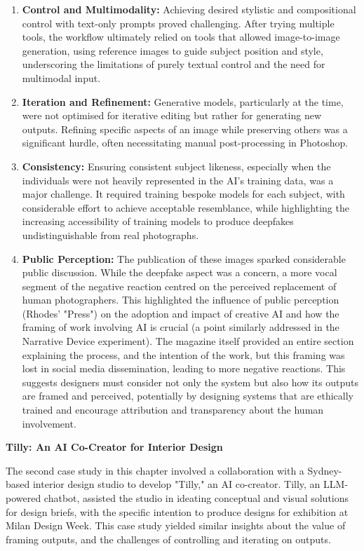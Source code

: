 \begin{enumerate}
    \item \textbf{Control and Multimodality:} Achieving desired stylistic and compositional control with text-only prompts proved challenging. After trying multiple tools, the workflow ultimately relied on tools that allowed image-to-image generation, using reference images to guide subject position and style, underscoring the limitations of purely textual control and the need for multimodal input.
    \item \textbf{Iteration and Refinement:} Generative models, particularly at the time, were not optimised for iterative editing but rather for generating new outputs. Refining specific aspects of an image while preserving others was a significant hurdle, often necessitating manual post-processing in Photoshop.
    \item \textbf{Consistency:} Ensuring consistent subject likeness, especially when the individuals were not heavily represented in the AI's training data, was a major challenge. It required training bespoke models for each subject, with considerable effort to achieve acceptable resemblance, while highlighting the increasing accessibility of training models to produce deepfakes undistinguishable from real photographs. 
    \item \textbf{Public Perception:} The publication of these images sparked considerable public discussion. While the deepfake aspect was a concern, a more vocal segment of the negative reaction centred on the perceived replacement of human photographers. This highlighted the influence of public perception (Rhodes' "Press") on the adoption and impact of creative AI and how the framing of work involving AI is crucial (a point similarly addressed in the Narrative Device experiment). The magazine itself provided an entire section explaining the process, and the intention of the work, but this framing was lost in social media dissemination, leading to more negative reactions. This suggests designers must consider not only the system but also how its outputs are framed and perceived, potentially by designing systems that are ethically trained and encourage attribution and transparency about the human involvement.
\end{enumerate}

\textbf{Tilly: An AI Co-Creator for Interior Design}

The second case study in this chapter involved a collaboration with a Sydney-based interior design studio to develop "Tilly," an AI co-creator. Tilly, an LLM-powered chatbot, assisted the studio in ideating conceptual and visual solutions for design briefs, with the specific intention to produce designs for exhibition at Milan Design Week. This case study yielded similar insights about the value of framing outputs, and the challenges of controlling and iterating on outputs. 

